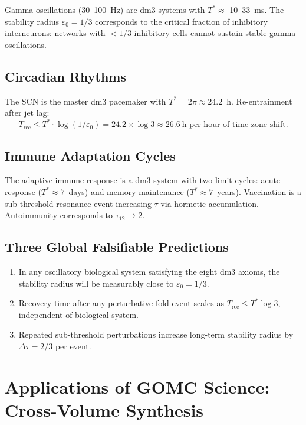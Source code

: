 \documentclass[11pt, twoside, openright]{book}
\theoremstyle{plain}
\theoremstyle{definition}
\newcommand{\eps}{\varepsilon_0}
\begin{document}
Gamma oscillations (30--100~Hz) are dm3 systems with $T^* \approx$
10--33~ms. The stability radius $\eps = 1/3$ corresponds to the
critical fraction of inhibitory interneurons: networks with $< 1/3$
inhibitory cells cannot sustain stable gamma oscillations.

\section{Circadian Rhythms}

The SCN is the master dm3 pacemaker with $T^* = 2\pi \approx 24.2$~h.
Re-entrainment after jet lag:
\[
T_{\mathrm{rec}} \le T^* \cdot \log(1/\eps) = 24.2 \times \log 3
\approx 26.6~\text{h per hour of time-zone shift.}
\]

\section{Immune Adaptation Cycles}

The adaptive immune response is a dm3 system with two limit cycles:
acute response ($T^* \approx 7$~days) and memory maintenance
($T^* \approx 7$~years). Vaccination is a sub-threshold resonance
event increasing $\tau$ via hormetic accumulation. Autoimmunity
corresponds to $\tau_{12} \to 2$.

\section{Three Global Falsifiable Predictions}

\begin{enumerate}[label=\arabic*.]
  \item In any oscillatory biological system satisfying the eight dm3
    axioms, the stability radius will be measurably close to $\eps = 1/3$.
  \item Recovery time after any perturbative fold event scales as
    $T_{\mathrm{rec}} \le T^*\log 3$, independent of biological system.
  \item Repeated sub-threshold perturbations increase long-term
    stability radius by $\Delta\tau = 2/3$ per event.
\end{enumerate}

\chapter{Applications of GOMC Science: Cross-Volume Synthesis}
\end{document}
